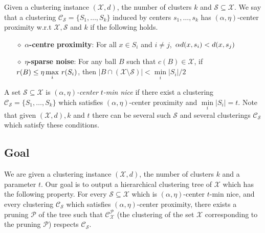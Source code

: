 \documentclass[11pt]{article}
\newcommand{\mc}{\mathcal}
\begin{document}
\begin{definition}
Given a clustering instance $(\mc X, d)$, the number of clusters $k$ and $\mc S \subseteq \mc X$. We say that a clustering $\mc C_{\mc S} = \{S_1, \ldots, S_k\}$ induced by centers $s_1, \ldots, s_k$ has $(\alpha, \eta)$-center proximity w.r.t $\mc X, \mc S$ and $k$ if the following holds.

\begin{itemize}[nolistsep, noitemsep]
\label{defn:alphacpnoise}	

\item[$\diamond$] {\bf $\alpha$-centre proximity}: For all $x \in S_i$ and $i\neq j$, $\thinspace\alpha d(x, s_i) < d(x, s_j)$
\item[$\diamond$]{\bf $\eta$-sparse noise}: For any ball $B$ such that $c(B)\in \mathcal{X}$, if $r(B)\leq \eta\max\limits_{i} \thinspace r(S_i)$, then $|B\cap (\mc X\setminus \mc S)| < \min\limits_{i} |S_i|/2$
\end{itemize}
\end{definition}

\noindent A set $\mc S \subseteq \mc X$ is {\it $(\alpha, \eta)$-center} {\it $t$-min nice} if there exist a clustering $\mc C_{\mc S}=\{S_1,\ldots,S_k\}$ which satisfies $(\alpha, \eta)$-center proximity and $\min\limits_{i} \lvert S_i\rvert = t$. Note that given $(\mc X, d), k$ and $t$ there can be several such $\mc S$ and several clusterings $\mc C_{\mc S}$ which satisfy these conditions.


\subsection{Goal}
We are given a clustering instance $(\mc X, d)$, the number of clusters $k$ and a parameter $t$. Our goal is to output a hierarchical clustering tree of $\mc X$ which has the following property. For every $\mc S \subseteq \mc X$ which is $(\alpha, \eta)$-center $t$-min nice, and every clustering $\mc C_{\mc S}$ which satisfies $(\alpha, \eta)$-center proximity, there exists a pruning $\mc P$ of the tree such that $\mc C_{\mc X}^{\mc P}$ (the clustering of the set $\mc X$ corresponding to the pruning $\mc P$) respects $\mc C_{\mc S}$. 
\end{document}
